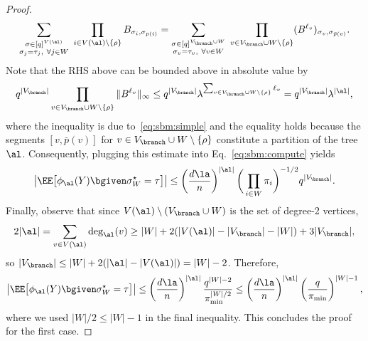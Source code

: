 \documentclass[11pt]{article}
\begin{document}
\begin{proof}
\[
\sum_{\substack{\sigma\in [q]^{V(\al)}\\\sigma_j=\tau_j,~\forall j\in W}}~\prod_{i\in V(\al)\setminus\{\rho\}}B_{\sigma_i,\sigma_{p(i)}}=\sum_{\substack{\sigma\in [q]^{V_{\branch}\cup W}\\ \sigma_v=\tau_v,~\forall v\in W}}~\prod_{v\in V_{\branch}\cup W\setminus\{\rho\}} (B^{\ell_v})_{\sigma_v, \sigma_{\bar{p}(v)}}.
\]
Note that the RHS above can be bounded above in absolute value by
\[
q^{|V_{\branch}|}\prod_{v\in V_{\branch}\cup W\setminus\{\rho\}}\|B^{\ell_v}\|_{\infty}\leq q^{|V_{\branch}|}\lambda^{\sum_{v\in V_{\branch}\cup W\setminus\{\rho\}}\ell_v}=q^{|V_{\branch}|}\lambda^{|\al|},
\]
where the inequality is due to~\eqref{eq:sbm:simple} and the equality holds because the segments $[v,\bar{p}(v)]$ for $v\in V_{\branch}\cup W\setminus\{\rho\}$ constitute a partition of the tree $\al$. Consequently, plugging this estimate into Eq.~\eqref{eq:sbm:compute} yields
\[
\big| \EE\big[\phi_{\al}(Y)\bgiven \sigma^\star_W=\tau\big]\big|\leq \left(\frac{d\la}{n}\right)^{|\al|}\bigg(\prod_{i\in W}\pi_i\bigg)^{-1/2}q^{|V_{\branch}|}. 
\]
Finally, observe that since $V(\al)\setminus (V_{\branch}\cup W)$ is the set of degree-2 vertices, 
\[
2|\al|=\sum_{v\in V(\al)} \deg_{\al}(v)\geq |W|+2(|V(\al)|-|V_{\branch}|-|W|)+ 3|V_{\branch}|,
\]
so $|V_{\branch}|\leq |W|+2(|\al|-|V(\al)|)=|W|-2$. Therefore,
\[
\big| \EE\big[\phi_{\al}(Y)\bgiven \sigma^\star_W=\tau\big]\big|\leq \left(\frac{d\la}{n}\right)^{|\al|}\frac{q^{|W|-2}}{\pi_{\min}^{|W|/2}}\leq \left(\frac{d\la}{n}\right)^{|\al|}\left(\frac{q}{\pi_{\min}}\right)^{|W|-1},
\]
where we used $|W|/2 \leq |W|-1$ in the final inequality. This concludes the proof for the first case.


\end{proof}
\end{document}
